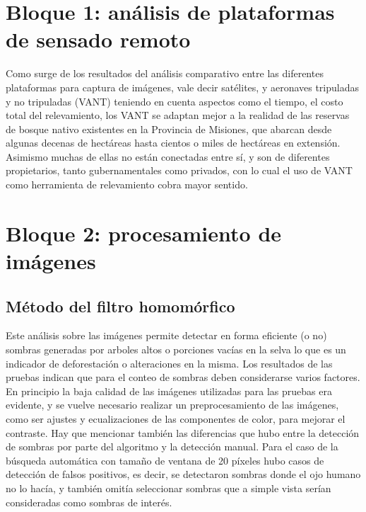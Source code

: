 \section{Bloque 1: análisis de plataformas de sensado remoto}
Como surge de los resultados del análisis comparativo entre las diferentes plataformas para captura de imágenes, vale decir satélites, y aeronaves tripuladas y no tripuladas (VANT) teniendo en cuenta aspectos como el tiempo, el costo total del relevamiento, los VANT se adaptan mejor a la realidad de las reservas de bosque nativo existentes en la Provincia de Misiones, que abarcan desde algunas decenas de hectáreas hasta cientos o miles de hectáreas en extensión. Asimismo muchas de ellas no están conectadas entre sí, y son de diferentes propietarios, tanto gubernamentales como privados, con lo cual el uso de VANT como herramienta de relevamiento cobra mayor sentido. 

\section{Bloque 2: procesamiento de imágenes}
\subsection{Método del filtro homomórfico}
Este análisis sobre las imágenes permite detectar en forma eficiente (o no) sombras generadas por arboles altos o porciones vacías en la selva lo que es un indicador de deforestación o alteraciones en la misma.
Los resultados de las pruebas indican que para el conteo de sombras deben considerarse varios factores. En principio la baja calidad de las imágenes utilizadas para las pruebas era evidente, y se vuelve necesario realizar un preprocesamiento de las imágenes, como ser ajustes y ecualizaciones de las componentes de color, para mejorar el contraste. Hay que mencionar también las diferencias que hubo entre la detección de sombras por parte del algoritmo y la detección manual. Para el caso de la búsqueda automática con tamaño de ventana de 20 píxeles hubo casos de detección de falsos positivos, es decir, se detectaron sombras donde el ojo humano no lo hacía, y también omitía seleccionar sombras que a simple vista serían consideradas como sombras de interés. 
